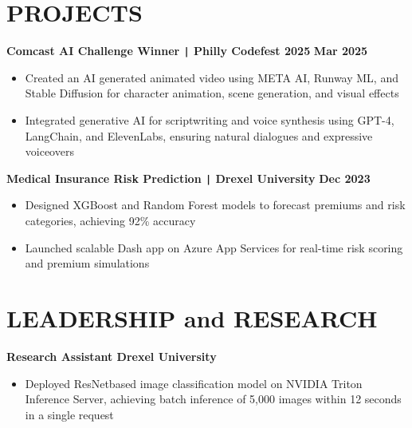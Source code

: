 \documentclass[10pt]{article}
\begin{document}
\vspace{-0.4cm}
\section*{PROJECTS}

\vspace{-0.1cm}
\noindent
\textbf{Comcast AI Challenge Winner \texttt{|} Philly Codefest 2025} \hfill \textbf{Mar 2025} \\
\vspace{-0.4cm}
\begin{itemize}[leftmargin=0.6cm, itemsep=-0.1cm, topsep=0cm]

    \item Created an AI generated animated video using META AI, Runway ML, and Stable Diffusion for character animation, scene generation, and visual effects

    \item Integrated generative AI for scriptwriting and voice synthesis using GPT-4, LangChain, and ElevenLabs, ensuring natural dialogues and expressive voiceovers

\end{itemize}

\vspace{-0.1cm}
\noindent
\textbf{Medical Insurance Risk Prediction \texttt{|} Drexel University} \hfill \textbf{Dec 2023} \\
\vspace{-0.4cm}
\begin{itemize}[leftmargin=0.6cm, itemsep=-0.1cm, topsep=0cm]

    \item Designed XGBoost and Random Forest models to forecast premiums and risk categories, achieving 92\% accuracy

    \item Launched scalable Dash app on Azure App Services for real-time risk scoring and premium simulations

\end{itemize}


\vspace{-0.4cm}
\section*{LEADERSHIP and RESEARCH}
\vspace{-0.1cm}

\noindent
\textbf{Research Assistant \textbar{} Drexel University} \\
\vspace{-0.4cm}
\begin{itemize}[leftmargin=0.6cm, itemsep=-0.1cm, topsep=0cm]

    \item Deployed ResNetbased image classification model on NVIDIA Triton Inference Server, achieving batch inference of 5,000 images within 12 seconds in a single request

\end{itemize}
\end{document}
